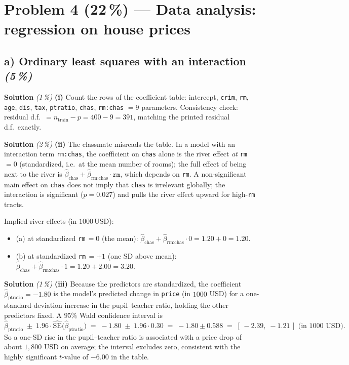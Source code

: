 \documentclass[11pt,a4paper]{article}
\newcommand{\points}[1]{\textbf{(#1\,\%)}}
\newcommand{\subpoints}[1]{\textit{(#1\,\%)}}
\newcommand{\sol}{\noindent\textbf{Solution}}
\begin{document}
\section*{Problem 4 \points{22} --- Data analysis: regression on house prices}

\subsection*{a) Ordinary least squares with an interaction \subpoints{5}}

\sol{} \subpoints{1} \textbf{(i)} Count the rows of the coefficient table: intercept, \texttt{crim},
\texttt{rm}, \texttt{age}, \texttt{dis}, \texttt{tax}, \texttt{ptratio}, \texttt{chas}, \texttt{rm:chas}
$=\boxed{9}$ parameters. Consistency check: residual d.f.\ $= n_\text{train} - p = 400 - 9 = 391$, matching
the printed residual d.f.\ exactly. \checkmark

\medskip
\sol{} \subpoints{2} \textbf{(ii)} The classmate misreads the table. In a model with an interaction term
\texttt{rm:chas}, the coefficient on \texttt{chas} alone is the river effect \emph{at} \texttt{rm}\,$=0$
(standardized, i.e.\ at the mean number of rooms); the full effect of being next to the river is
$\hat\beta_{\text{chas}} + \hat\beta_{\text{rm:chas}}\cdot\texttt{rm}$, which depends on \texttt{rm}.
A non-significant main effect on \texttt{chas} does not imply that \texttt{chas} is irrelevant globally;
the interaction is significant ($p=0.027$) and pulls the river effect upward for high-\texttt{rm} tracts.

Implied river effects (in $1000$\,USD):
\begin{itemize}
  \item (a) at standardized \texttt{rm}\,$=0$ (the mean):
        $\hat\beta_{\text{chas}} + \hat\beta_{\text{rm:chas}}\cdot 0 = 1.20 + 0 = \boxed{1.20}.$
  \item (b) at standardized \texttt{rm}\,$=+1$ (one SD above mean):
        $\hat\beta_{\text{chas}} + \hat\beta_{\text{rm:chas}}\cdot 1 = 1.20 + 2.00 = \boxed{3.20}.$
\end{itemize}

\medskip
\sol{} \subpoints{1} \textbf{(iii)} Because the predictors are standardized, the coefficient
$\hat\beta_{\text{ptratio}} = -1.80$ is the model's predicted change in \texttt{price} (in $1000$ USD)
for a one-standard-deviation increase in the pupil--teacher ratio, holding the other predictors fixed.
A $95\%$ Wald confidence interval is
$$\hat\beta_{\text{ptratio}} \;\pm\; 1.96\cdot\widehat{\mathrm{SE}}\bigl(\hat\beta_{\text{ptratio}}\bigr)
   \;=\; -1.80 \;\pm\; 1.96\cdot 0.30 \;=\; -1.80 \pm 0.588
   \;=\; \boxed{[\,-2.39,\;-1.21\,]}\text{ (in $1000$ USD).}$$
So a one-SD rise in the pupil--teacher ratio is associated with a price drop of about $1{,}800$ USD on
average; the interval excludes zero, consistent with the highly significant $t$-value of $-6.00$ in the
table.
\end{document}

